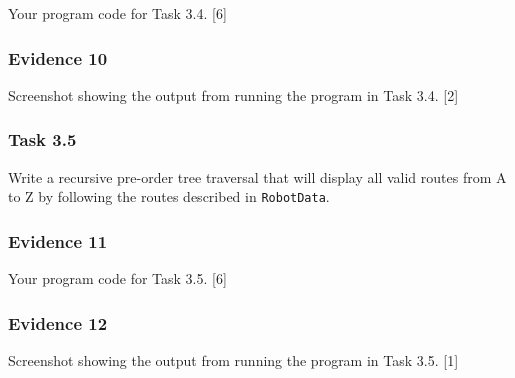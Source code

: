Your program code for Task 3.4. \hfill{}{[}6{]}

\subsubsection*{Evidence 10}

Screenshot showing the output from running the program in Task 3.4.\hfill{}
{[}2{]}

\subsubsection*{Task 3.5}

Write a recursive pre-order tree traversal that will display all valid
routes from A to Z by following the routes described in \texttt{RobotData}.

\subsubsection*{Evidence 11}

Your program code for Task 3.5.\hfill{} {[}6{]}

\subsubsection*{Evidence 12}

Screenshot showing the output from running the program in Task 3.5.\hfill{}
{[}1{]}